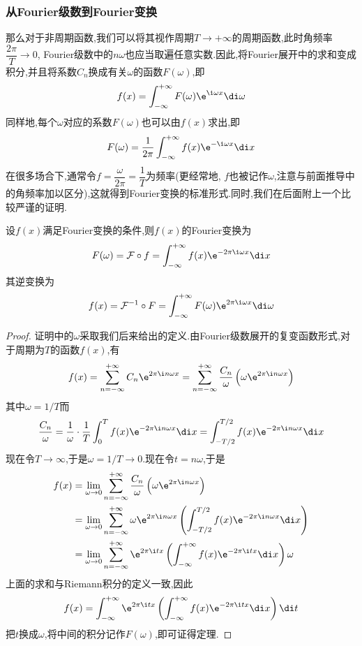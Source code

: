 \documentclass{ctexart}
\begin{document}
\subsubsection{从Fourier级数到Fourier变换}
那么对于非周期函数,我们可以将其视作周期$T\to+\infty$的周期函数,此时角频率$\dfrac{2\pi}{T}\to0$, Fourier级数中的$n\omega$也应当取遍任意实数.因此,将Fourier展开中的求和变成积分,并且将系数$C_n$换成有关$\omega$的函数$F(\omega)$,即
\[f(x)=\int_{-\infty}^{+\infty}F(\omega)\e^{\i \omega x}\di\omega\]
同样地,每个$\omega$对应的系数$F(\omega)$也可以由$f(x)$求出,即
\[F(\omega)=\dfrac{1}{2\pi}\int_{-\infty}^{+\infty}f(x)\e^{-\i \omega x}\di x\]
在很多场合下,通常令$f=\dfrac{\omega}{2\pi}=\dfrac{1}{T}$为频率(更经常地, $f$也被记作$\omega$,注意与前面推导中的角频率加以区分),这就得到Fourier变换的标准形式.同时,我们在后面附上一个比较严谨的证明.
\begin{theorem}
    设$f(x)$满足Fourier变换的条件,则$f(x)$的Fourier变换为
    \[F(\omega)=\mathcal{F}\circ f=\int_{-\infty}^{+\infty}f(x)\e^{-2\pi\i\omega x}\di x\]
    其逆变换为
    \[f(x)=\mathcal{F}^{-1}\circ F=\int_{-\infty}^{+\infty}F(\omega)\e^{2\pi\i\omega x}\di\omega\]
\end{theorem}
\begin{proof}
    证明中的$\omega$采取我们后来给出的定义.由Fourier级数展开的复变函数形式,对于周期为$T$的函数$f(x)$,有
    \[f(x)=\sum_{n=-\infty}^{+\infty}C_n\e^{2\pi\i n\omega x}=\sum_{n=-\infty}^{+\infty}\dfrac{C_n}{\omega}\left(\omega\e^{2\pi\i n\omega x}\right)\]
    其中$\omega=1/T$而
    \[\dfrac{C_n}{\omega}=\dfrac{1}{\omega}\cdot\dfrac{1}{T}\int_0^{T}f(x)\e^{-2\pi\i n\omega x}\di x=\int_{-T/2}^{T/2}f(x)\e^{-2\pi\i n\omega x}\di x\]
    现在令$T\to\infty$,于是$\omega=1/T\to0$.现在令$t=n\omega$,于是
    \[\begin{aligned}
        f(x)
        &= \lim_{\omega\to0}\sum_{n=-\infty}^{+\infty}\dfrac{C_n}{\omega}\left(\omega\e^{2\pi\i n\omega x}\right) \\
        &= \lim_{\omega\to0}\sum_{n=-\infty}^{+\infty}\omega\e^{2\pi\i n\omega x}\left(\int_{-T/2}^{T/2}f(x)\e^{-2\pi\i n\omega x}\di x\right) \\
        &= \lim_{\omega\to0}\sum_{n=-\infty}^{+\infty}\e^{2\pi\i t x}\left(\int_{-\infty}^{+\infty}f(x)\e^{-2\pi\i t x}\di x\right)\omega\\
    \end{aligned}\]
    上面的求和与Riemann积分的定义一致,因此
    \[f(x)=\int_{-\infty}^{+\infty}\e^{2\pi\i t x}\left(\int_{-\infty}^{+\infty}f(x)\e^{-2\pi\i t x}\di x\right)\di t\]
    把$t$换成$\omega$,将中间的积分记作$F(\omega)$,即可证得定理.
\end{proof}
\end{document}
